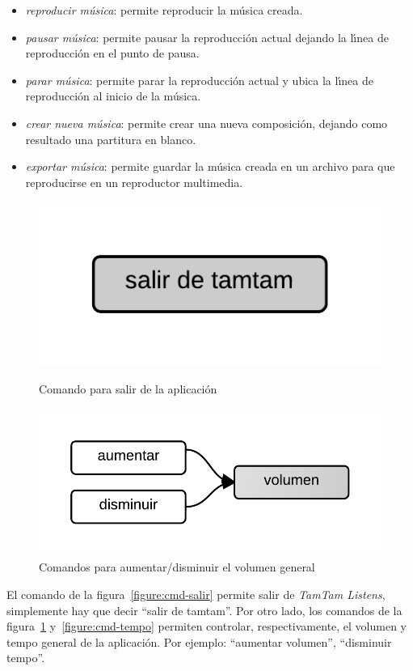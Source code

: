 \begin{itemize}
\item \emph{reproducir m\'usica}: permite reproducir la m\'usica creada.
\item \emph{pausar m\'usica}: permite pausar la reproducci\'on actual dejando la l{\'\i}nea de reproducci\'on en el
punto de pausa.
\item \emph{parar m\'usica}: permite parar la reproducci\'on actual y ubica la l{\'\i}nea de reproducci\'on al inicio de
la m\'usica.
\item \emph{crear nueva m\'usica}:  permite crear una nueva composici\'on, dejando como resultado una
partitura en blanco.
\item \emph{exportar m\'usica}: permite guardar la m\'usica creada en un archivo para que reproducirse en un
reproductor multimedia.
\end{itemize}

\begin{figure}[H]
\begin{minipage}[b]{0.5\linewidth}
\centering
\includegraphics[width=0.6\linewidth]{./graphics/salir.png}
\caption{Comando para salir de la aplicaci\'on}
\label{figure:cmd-salir}
\end{minipage}
\quad
\begin{minipage}[b]{0.5\linewidth}
\centering
\includegraphics[width=0.6\linewidth]{./graphics/cmd-vol.png}
\caption{Comandos para aumentar/disminuir el volumen general}
\label{figure:cmd-vol}
\end{minipage}
\end{figure}

El comando de la figura~\ref{figure:cmd-salir} permite salir de \emph{TamTam Listens}, simplemente hay que decir ``salir de tamtam''. Por otro lado, los comandos de la figura~\ref{figure:cmd-vol}
y~\ref{figure:cmd-tempo} permiten controlar, respectivamente, el volumen y tempo general de la aplicaci\'on. Por ejemplo: ``aumentar volumen'', ``disminuir tempo''.

